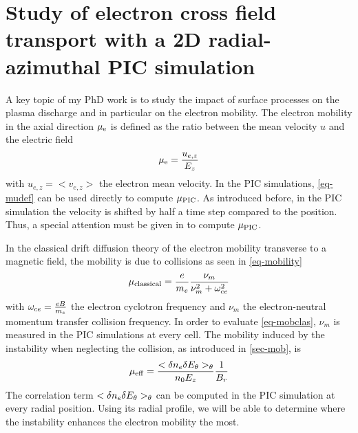 
\section{Study of electron cross field transport with a 2D radial-azimuthal PIC simulation}
  \label{sec-transport}
  

  A key topic of my PhD work is to study the impact of surface processes on the plasma discharge and in particular on the electron mobility.   
  The electron mobility in the axial direction $\mu_{\mathrm{e}}$ is defined as the ratio between the mean velocity $u$ and the electric field
  \begin{equation} \label{eq-mudef}
    \mu_{\mathrm{e}} = \frac{u_{e,z}}{E_z}
  \end{equation}
  with $u_{e,z}=<v_{e,z}>$ the electron mean velocity.
  In the \ac{PIC} simulations, \cref{eq-mudef} can be used directly to compute $\mu_{\mathrm{PIC}}$.
  As introduced before, in the \ac{PIC} simulation the velocity is shifted by half a time step compared to the position.
  Thus, a special attention must be given in to compute $\mu_{\mathrm{PIC}}$.
  
  In the classical drift diffusion theory of the electron mobility transverse to a magnetic field, the mobility is due to collisions as seen in \cref{eq-mobility} 
  \begin{equation} \label{eq-mobclas}
    \mu_{\mathrm{classical}} = \frac{e}{m_e} \frac{\nu_m}{\nu_m^2 + \omega_{ce}^2}
  \end{equation}
  with $\omega_{ce}=\frac{e B}{m_e}$ the electron cyclotron frequency and $\nu_m$ the electron-neutral momentum transfer collision frequency.
  In order to evaluate \cref{eq-mobclas},  $\nu_m$ is measured in the \ac{PIC} simulations at every cell.
  The mobility induced by the instability when neglecting the collision, as introduced in \cref{sec-mob}, is 
  \begin{equation} \label{eq-eq_mobeffsimple_two}
      \mu_{\mathrm{eff}} = \frac{< \delta n_e \delta E_{\theta} >_{\theta} }{n_0 E_z}   \frac{1}{B_r}
  \end{equation}
  The correlation term $< \delta n_e \delta E_{\theta} >_{\theta}$ can be computed in the \ac{PIC} simulation at every radial position.
  Using its radial profile, we will be able to determine where the instability enhances the electron mobility the most.
  
